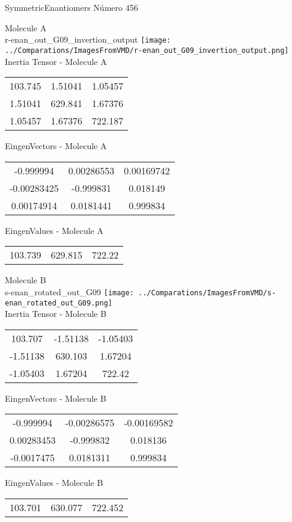 \vtab[-2cm]
\begin{center}
{\large SymmetricEnantiomers \tab Número 456}
\end{center}
\begin{multicols}{2}
\begin{center}

Molecule A \\ 
r-enan\_out\_G09\_invertion\_output
\texttt{[image: ../Comparations/ImagesFromVMD/r-enan\_out\_G09\_invertion\_output.png]}
\\
Inertia Tensor - Molecule A \\
\vtab

\begin{tabular}{|c c c|}
103.745	 & 	1.51041	 & 	1.05457	 \\
1.51041	 & 	629.841	 & 	1.67376	 \\
1.05457	 & 	1.67376	 & 	722.187
\end{tabular}

\vtab
 EingenVectors - Molecule A     \\
\vtab
\begin{tabular}{|c c c|}
-0.999994	 & 	0.00286553	 & 	0.00169742	 \\
-0.00283425	 & 	-0.999831	 & 	0.018149	 \\
0.00174914	 & 	0.0181441	 & 	0.999834
\end{tabular}

\vtab
 EingenValues - Molecule A     \\
\vtab
\begin{tabular}{|c c c|}
103.739	 & 	629.815	 & 	722.22	 \\
\end{tabular}
\columnbreak

Molecule B \\ 
s-enan\_rotated\_out\_G09
\texttt{[image: ../Comparations/ImagesFromVMD/s-enan\_rotated\_out\_G09.png]}
\\
Inertia Tensor - Molecule B \\
\vtab

\begin{tabular}{|c c c|}
103.707	 & 	-1.51138	 & 	-1.05403	 \\
-1.51138	 & 	630.103	 & 	1.67204	 \\
-1.05403	 & 	1.67204	 & 	722.42
\end{tabular}

\vtab
 EingenVectors - Molecule B     \\
\vtab
\begin{tabular}{|c c c|}
-0.999994	 & 	-0.00286575	 & 	-0.00169582	 \\
0.00283453	 & 	-0.999832	 & 	0.018136	 \\
-0.0017475	 & 	0.0181311	 & 	0.999834
\end{tabular}

\vtab
 EingenValues - Molecule B     \\
\vtab
\begin{tabular}{|c c c|}
103.701	 & 	630.077	 & 	722.452	 \\
\end{tabular}

\end{center}
\end{multicols}
